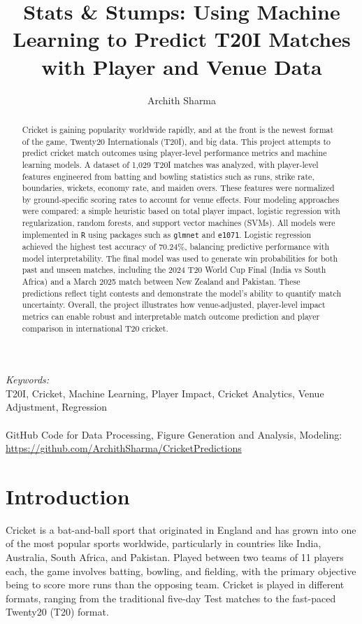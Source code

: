 \documentclass{article}[12pt]
\title{Stats \& Stumps: Using Machine Learning to Predict T20I Matches with Player and Venue Data}
\author[1]{Archith Sharma}
\date{}
\affil[1]{Texas Academy of Mathematics and Science}
\begin{document}
\maketitle
\begin{abstract}
Cricket is gaining popularity worldwide rapidly, and at the front is the newest format of the game, Twenty20 Internationals (T20I), and big data. This project attempts to predict cricket match outcomes using player-level performance metrics and machine learning models. A dataset of 1,029 T20I matches was analyzed, with player-level features engineered from batting and bowling statistics such as runs, strike rate, boundaries, wickets, economy rate, and maiden overs. These features were normalized by ground-specific scoring rates to account for venue effects. Four modeling approaches were compared: a simple heuristic based on total player impact, logistic regression with regularization, random forests, and support vector machines (SVMs). All models were implemented in \texttt{R} using packages such as \texttt{glmnet} and \texttt{e1071}. Logistic regression achieved the highest test accuracy of 70.24\%, balancing predictive performance with model interpretability. The final model was used to generate win probabilities for both past and unseen matches, including the 2024 T20 World Cup Final (India vs South Africa) and a March 2025 match between New Zealand and Pakistan. These predictions reflect tight contests and demonstrate the model's ability to quantify match uncertainty. Overall, the project illustrates how venue-adjusted, player-level impact metrics can enable robust and interpretable match outcome prediction and player comparison in international T20 cricket.
\end{abstract}
\textit{Keywords:} \\
T20I, Cricket, Machine Learning, Player Impact, Cricket Analytics, Venue Adjustment, Regression
\\
\\
GitHub Code for Data Processing, Figure Generation and Analysis, Modeling: \\ \href{https://github.com/ArchithSharma/CricketPredictions}{https://github.com/ArchithSharma/CricketPredictions}

\pagebreak
\tableofcontents
\pagebreak
\section{Introduction}

Cricket is a bat-and-ball sport that originated in England and has grown into one of the most popular sports worldwide, particularly in countries like India, Australia, South Africa, and Pakistan. Played between two teams of 11 players each, the game involves batting, bowling, and fielding, with the primary objective being to score more runs than the opposing team. Cricket is played in different formats, ranging from the traditional five-day Test matches to the fast-paced Twenty20 (T20) format.
\end{document}
